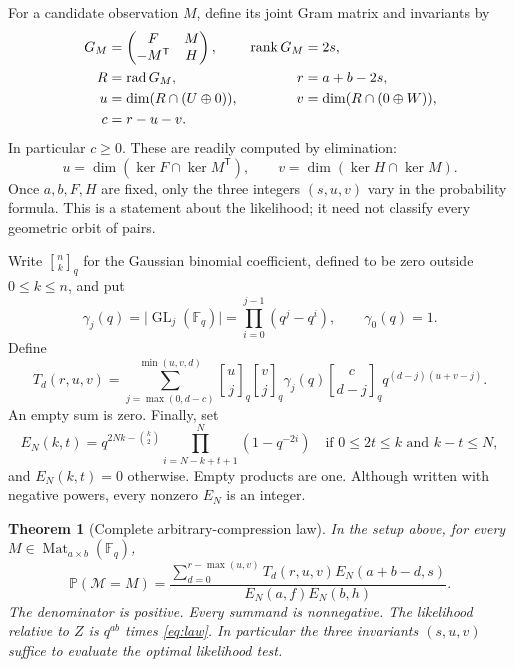 \documentclass[11pt]{article}
\numberwithin{equation}{section}
\newtheorem{theorem}{Theorem}[section]
\theoremstyle{definition}
\theoremstyle{remark}
\newcommand{\F}{\mathbb F}
\newcommand{\Prob}{\mathbb P}
\newcommand{\Mat}{\operatorname{Mat}}
\newcommand{\GL}{\operatorname{GL}}
\newcommand{\rank}{\operatorname{rank}}
\newcommand{\rad}{\operatorname{rad}}
\newcommand{\tr}{\mathsf T}
\newcommand{\qbin}[2]{\genfrac{[}{]}{0pt}{}{#1}{#2}_{q}}
\newcommand{\abs}[1]{\lvert#1\rvert}
\begin{document}
For a candidate observation $M$, define its joint Gram matrix and invariants by
\begin{align}
 G_M&=\begin{pmatrix}F&M\\-M^\tr&H\end{pmatrix},
 &\rank G_M&=2s,\label{eq:joint}\\
 R&=\rad G_M,&r&=a+b-2s,\notag\\
 u&=\dim(R\cap(U\oplus0)),
 &v&=\dim(R\cap(0\oplus W)),\label{eq:uv}\\
 c&=r-u-v.&&\notag
\end{align}
In particular $c\ge0$. These are readily computed by elimination:
\begin{equation}\label{eq:computeuv}
 u=\dim(\ker F\cap\ker M^\tr),\qquad
 v=\dim(\ker H\cap\ker M).
\end{equation}
Once $a,b,F,H$ are fixed, only the three integers $(s,u,v)$ vary in the probability formula. This is a statement about the likelihood; it need not classify every geometric orbit of pairs.

Write $\qbin nk$ for the Gaussian binomial coefficient, defined to be zero outside $0\le k\le n$, and put
\[
 \gamma_j(q)=\abs{\GL_j(\F_q)}=\prod_{i=0}^{j-1}(q^j-q^i),\qquad \gamma_0(q)=1.
\]
Define
\begin{equation}\label{eq:T}
 T_d(r,u,v)=
 \sum_{j=\max(0,d-c)}^{\min(u,v,d)}
 \qbin uj\qbin vj\gamma_j(q)\qbin c{d-j}
 q^{(d-j)(u+v-j)}.
\end{equation}
An empty sum is zero. Finally, set
\begin{equation}\label{eq:E}
 E_N(k,t)=q^{2Nk-\binom k2}
 \prod_{i=N-k+t+1}^{N}(1-q^{-2i})
 \quad\text{if }0\le2t\le k\text{ and }k-t\le N,
\end{equation}
and $E_N(k,t)=0$ otherwise. Empty products are one. Although written with negative powers, every nonzero $E_N$ is an integer.

\begin{theorem}[Complete arbitrary-compression law]\label{thm:law}
In the setup above, for every $M\in\Mat_{a\times b}(\F_q)$,
\begin{equation}\label{eq:law}
 \boxed{\displaystyle
 \Prob(\mathcal M=M)=
 \frac{\displaystyle\sum_{d=0}^{r-\max(u,v)}
 T_d(r,u,v)E_N(a+b-d,s)}{E_N(a,f)E_N(b,h)}.}
\end{equation}
The denominator is positive. Every summand is nonnegative. The likelihood relative to $Z$ is $q^{ab}$ times \eqref{eq:law}. In particular the three invariants $(s,u,v)$ suffice to evaluate the optimal likelihood test.
\end{theorem}
\end{document}

